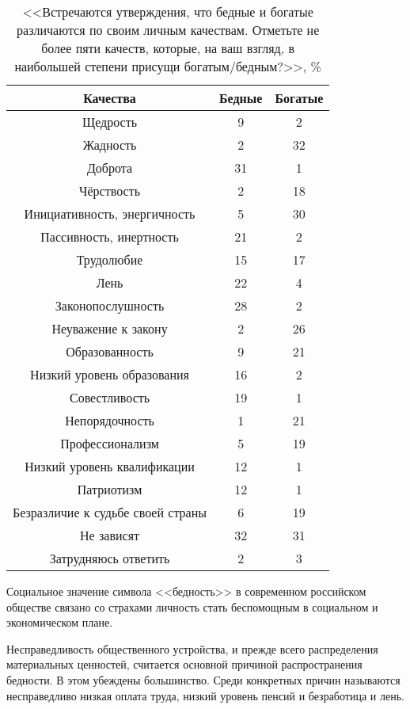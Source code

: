 \begin{table}[h!]
    \centering
    \begin{tabular}{|c|c|c|}
        \hline
        Качества & Бедные & Богатые \\ \hline \hline
        Щедрость & 9 & 2 \\ \hline
        Жадность & 2 & 32 \\ \hline
        Доброта & 31 & 1 \\ \hline
        Чёрствость & 2 & 18 \\ \hline
        Инициативность, энергичность & 5 & 30 \\ \hline
        Пассивность, инертность & 21 & 2 \\ \hline
        Трудолюбие & 15 & 17 \\ \hline
        Лень & 22 & 4 \\ \hline
        Законопослушность & 28 & 2 \\ \hline
        Неуважение к закону & 2 & 26 \\ \hline
        Образованность & 9 & 21 \\ \hline
        Низкий уровень образования & 16 & 2 \\ \hline
        Совестливость & 19 & 1 \\ \hline
        Непорядочность & 1 & 21 \\ \hline
        Профессионализм & 5 & 19 \\ \hline
        Низкий уровень квалификации & 12 & 1 \\ \hline
        Патриотизм & 12 & 1 \\ \hline
        Безразличие к судьбе своей страны & 6 & 19 \\ \hline
        Не зависят & 32 & 31 \\ \hline
        Затрудняюсь ответить & 2 & 3 \\ \hline
    \end{tabular}
    \caption{<<Встречаются утверждения, что бедные и богатые различаются по 
        своим личным качествам. Отметьте не более пяти качеств, которые, 
        на ваш взгляд, в наибольшей степени присущи богатым/бедным?>>, \%}
\end{table}

Социальное значение символа <<бедность>> в современном российском обществе 
связано со страхами личность стать беспомощным в социальном и экономическом 
плане. 

Несправедливость общественного устройства, и прежде всего распределения 
материальных ценностей, считается основной причиной распространения бедности. 
В этом убеждены большинство. Среди конкретных причин называются несправедливо 
низкая оплата труда, низкий уровень пенсий и безработица и лень.

